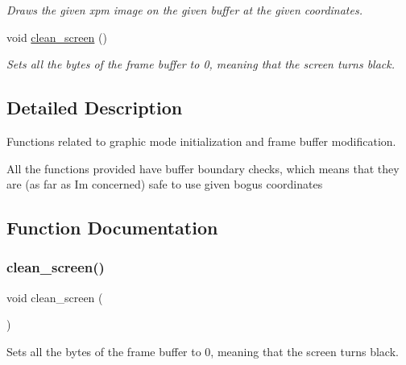 \begin{DoxyCompactItemize}
\begin{DoxyCompactList}\small\item\em Draws the given xpm image on the given buffer at the given coordinates. \end{DoxyCompactList}\item 
void \hyperlink{group__video__card_ga0d199b5702695c4d7b78ef83759c32d5}{clean\+\_\+screen} ()
\begin{DoxyCompactList}\small\item\em Sets all the bytes of the frame buffer to 0, meaning that the screen turns black. \end{DoxyCompactList}\end{DoxyCompactItemize}


\subsection{Detailed Description}
Functions related to graphic mode initialization and frame buffer modification. 

All the functions provided have buffer boundary checks, which means that they are (as far as I\textquotesingle{}m concerned) safe to use given bogus coordinates 

\subsection{Function Documentation}
\mbox{\label{group__video__card_ga0d199b5702695c4d7b78ef83759c32d5}} 
\subsubsection{\texorpdfstring{clean\+\_\+screen()}{clean\_screen()}}
{\footnotesize\ttfamily void clean\+\_\+screen (\begin{DoxyParamCaption}{ }\end{DoxyParamCaption})}



Sets all the bytes of the frame buffer to 0, meaning that the screen turns black. 

\mbox{\label{group__video__card_ga461fb4a3b5536b3de26e342444394ddd}} 
